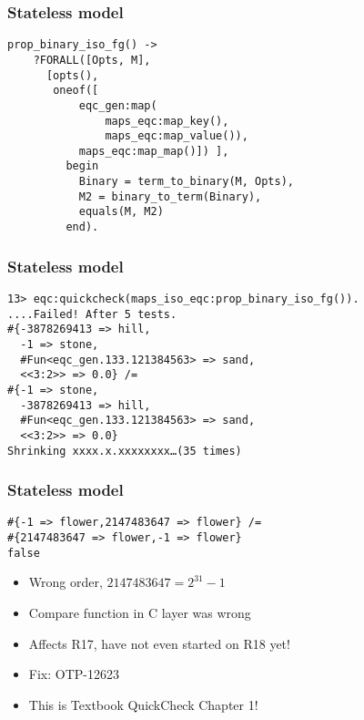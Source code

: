 \documentclass[lualatex]{beamer}
\begin{document}
\begin{frame}[fragile]
\frametitle{Stateless model}

\begin{verbatim}
prop_binary_iso_fg() ->
    ?FORALL([Opts, M],
      [opts(),
       oneof([
           eqc_gen:map(
               maps_eqc:map_key(),
               maps_eqc:map_value()),
           maps_eqc:map_map()]) ],
         begin
           Binary = term_to_binary(M, Opts),
           M2 = binary_to_term(Binary),
           equals(M, M2)
         end).
\end{verbatim}

\end{frame}

\begin{frame}[fragile]
\frametitle{Stateless model}

\begin{verbatim}
13> eqc:quickcheck(maps_iso_eqc:prop_binary_iso_fg()).
....Failed! After 5 tests.
#{-3878269413 => hill,
  -1 => stone,
  #Fun<eqc_gen.133.121384563> => sand,
  <<3:2>> => 0.0} /= 
#{-1 => stone,
  -3878269413 => hill,
  #Fun<eqc_gen.133.121384563> => sand,
  <<3:2>> => 0.0}
Shrinking xxxx.x.xxxxxxxx…(35 times)
\end{verbatim}
\end{frame}

\begin{frame}[fragile]
\frametitle{Stateless model}

\begin{verbatim}
#{-1 => flower,2147483647 => flower} /=
#{2147483647 => flower,-1 => flower}
false
\end{verbatim}

\begin{itemize}
\item Wrong order, $2147483647 = 2^{31}-1$
\item Compare function in C layer was wrong
\item Affects R17, have not even started on R18 yet!
\item Fix: OTP-12623
\item This is Textbook QuickCheck Chapter 1!
\end{itemize}

\end{frame}
\end{document}
